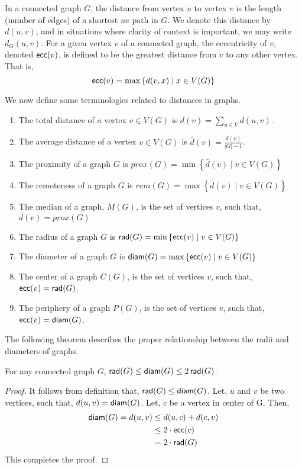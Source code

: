 \documentclass[../basic_graph_theory.tex]{subfiles}
\begin{document}
In a connected graph $G$, the distance from vertex $u$ to vertex $v$ is the length (number of edges) of a shortest $uv$ path in $G$. We denote this distance by $d(u,v)$, and in situations where clarity of context is important, we may write $d_G(u,v)$.
For a given vertex $v$ of a connected graph, the eccentricity of $v$, denoted $\operatorname{\mathsf{ecc}}(v)$, is defined to be the greatest distance from $v$ to any other vertex. That is,
\[
  \operatorname{\mathsf{ecc}}(v) = \max \left\{ d(v,x) \mid x \in V(G) \right\}
\]

We now define some terminologies related to distances in graphs.
\begin{enumerate}
  \item The total distance of a vertex $v \in V(G)$ is $d(v)=\sum_{u \in V} d(u,v)$.
  \item The average distance of a vertex $v \in V(G)$ is $\bar{d}(v)=\frac{d(v)}{|G|-1}$.
  \item The proximity of a graph $G$ is $prox(G) = \min \left\{\bar{d}(v) \mid v \in V(G) \right\}$
  \item The remoteness of a graph $G$ is $rem(G) = \max \left\{\bar{d}(v) \mid v \in V(G) \right\}$
  \item The median of a graph, $M(G)$, is the set of vertices $v$, such that, $\bar{d}(v)=prox(G)$
  \item The radius of a graph $G$ is $\operatorname{\mathsf{rad}}(G) = \min \left\{ \operatorname{\mathsf{ecc}}(v) \mid v \in V(G) \right\}$
  \item The diameter of a graph $G$ is $\operatorname{\mathsf{diam}}(G) = \max \left\{ \operatorname{\mathsf{ecc}}(v) \mid v \in V(G) \right\}$
  \item The center of a graph $C(G)$, is the set of vertices $v$, such that, $\operatorname{\mathsf{ecc}}(v)=\operatorname{\mathsf{rad}}(G)$.
  \item The periphery of a graph $P(G)$, is the set of vertices $v$, such that, $\operatorname{\mathsf{ecc}}(v)=\operatorname{\mathsf{diam}}(G)$.
\end{enumerate}

The following theorem describes the proper relationship between the radii and
diameters of graphs.

\begin{Thm}{}{}
  For any connected graph $G$, $\operatorname{\mathsf{rad}}(G) \le \operatorname{\mathsf{diam}}(G) \le 2\operatorname{\mathsf{rad}}(G)$.
\end{Thm}
\begin{proof}
  It follows from definition that, $\operatorname{\mathsf{rad}}(G) \le \operatorname{\mathsf{diam}}(G)$. Let, $u$ and $v$ be two vertices, such that, $d(u,v)=\operatorname{\mathsf{diam}}(G)$. Let, $c$ be a vertex in center of G. Then,
  \begin{align*}
    \operatorname{\mathsf{diam}}(G) = d(u,v)
     & \le d(u,c)+d(c,v)  \\
     & \le 2\cdot \operatorname{\mathsf{ecc}}(c) \\
     & = 2\cdot \operatorname{\mathsf{rad}}(G)
  \end{align*}
  This completes the proof.
\end{proof}
\end{document}
